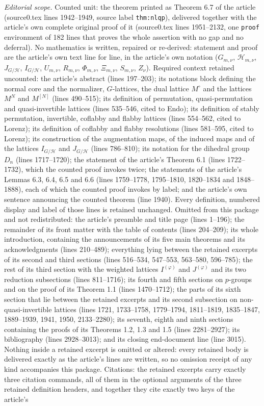 \documentclass[10pt,a4paper]{amsart}
\newcommand{\cH}{\mathcal{H}}
\begin{document}
\noindent\textit{Editorial scope.} Counted unit: the theorem printed as Theorem 6.7 of the article (source0.tex lines 1942--1949, source label \texttt{thm:nlqp}), delivered together with the article's own complete original proof of it (source0.tex lines 1951--2132, one \texttt{proof} environment of 182 lines that proves the whole assertion with no gap and no deferral). No mathematics is written, repaired or re-derived: statement and proof are the article's own text line for line, in the article's own notation ($G_{m,\nu}$, $\cH_{m,\nu}$, $J_{G/\cH}$, $I_{G/\cH}$, $U_{m,\nu}$, $R_{m,\nu}$, $\Phi_{m,\nu}$, $\Xi_{m,\nu}$, $S_{m,\nu}$, $Z_{\nu}$). Required context retained uncounted: the article's abstract (lines 197--203); its notations block defining the normal core and the normalizer, $G$-lattices, the dual lattice $M^{\circ}$ and the lattices $M^{N}$ and $M^{[N]}$ (lines 490--515); its definition of permutation, quasi-permutation and quasi-invertible lattices (lines 535--546, cited to Endo); its definition of stably permutation, invertible, coflabby and flabby lattices (lines 554--562, cited to Lorenz); its definition of coflabby and flabby resolutions (lines 581--595, cited to Lorenz); its construction of the augmentation maps, of the induced maps and of the lattices $I_{G/\cH}$ and $J_{G/\cH}$ (lines 786--810); its notation for the dihedral group $D_{n}$ (lines 1717--1720); the statement of the article's Theorem 6.1 (lines 1722--1732), which the counted proof invokes twice; the statements of the article's Lemmas 6.3, 6.4, 6.5 and 6.6 (lines 1759--1778, 1795--1810, 1820--1834 and 1848--1888), each of which the counted proof invokes by label; and the article's own sentence announcing the counted theorem (line 1940). Every definition, numbered display and label of those lines is retained unchanged. Omitted from this package and not redistributed: the article's preamble and title page (lines 1--196); the remainder of its front matter with the table of contents (lines 204--209); its whole introduction, containing the announcements of its five main theorems and its acknowledgments (lines 210--489); everything lying between the retained excerpts of its second and third sections (lines 516--534, 547--553, 563--580, 596--785); the rest of its third section with the weighted lattices $I^{(\varphi)}$ and $J^{(\varphi)}$ and its two reduction subsections (lines 811--1716); its fourth and fifth sections on $p$-groups and on the proof of its Theorem 1.1 (lines 1470--1712); the parts of its sixth section that lie between the retained excerpts and its second subsection on non-quasi-invertible lattices (lines 1721, 1733--1758, 1779--1794, 1811--1819, 1835--1847, 1889--1939, 1941, 1950, 2133--2280); its seventh, eighth and ninth sections containing the proofs of its Theorems 1.2, 1.3 and 1.5 (lines 2281--2927); its bibliography (lines 2928--3013); and its closing end-document line (line 3015). Nothing inside a retained excerpt is omitted or altered: every retained body is delivered exactly as the article's lines are written, so no omission receipt of any kind accompanies this package. Citations: the retained excerpts carry exactly three citation commands, all of them in the optional arguments of the three retained definition headers, and together they cite exactly two keys of the article's 
\end{document}
